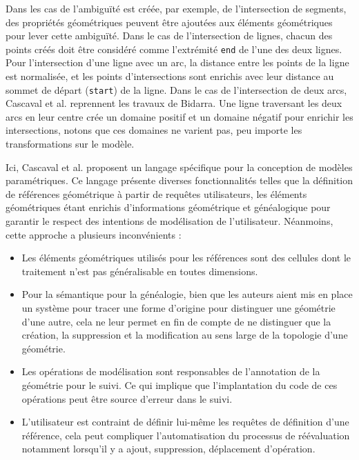 \documentclass[11pt, a4paper]{article}
\begin{document}

Dans les cas de l'ambiguïté est créée, par exemple, de l'intersection de
segments, des propriétés géométriques peuvent être ajoutées aux éléments
géométriques pour lever cette ambiguïté. %
Dans le cas de l'intersection de lignes, chacun des points créés doit être
considéré comme l'extrémité \texttt{end} de l'une des deux lignes. %
Pour l’intersection d'une ligne avec un arc, la distance entre les points de la
ligne est normalisée, et les points d'intersections sont enrichis avec leur
distance au sommet de départ (\texttt{start}) de la ligne. %
Dans le cas de l’intersection de deux arcs, Cascaval et al. reprennent les
travaux de Bidarra. Une ligne traversant les deux arcs en leur centre crée un
domaine positif et un domaine négatif pour enrichir les intersections, notons
que ces domaines ne varient pas, peu importe les transformations sur le modèle. %


Ici, Cascaval et al. proposent un langage spécifique pour la conception de
modèles paramétriques. Ce langage présente diverses fonctionnalités telles que
la définition de références géométrique à partir de requêtes utilisateurs, les
éléments géométriques étant enrichis d'informations géométrique et généalogique
pour garantir le respect des intentions de modélisation de l'utilisateur.
Néanmoins, cette approche a plusieurs inconvénients :
\begin{itemize}
	\item Les éléments géométriques utilisés pour les références sont des cellules
	      dont le traitement n'est pas généralisable en toutes dimensions.
	\item Pour la sémantique pour la généalogie, bien que les auteurs aient mis en
	      place un système pour tracer une forme d'origine pour distinguer une
	      géométrie d'une autre, cela ne leur permet en fin de compte de ne
	      distinguer que la création, la suppression et la modification au sens
	      large de la topologie d'une géométrie.
	\item Les opérations de modélisation sont responsables de l'annotation de la
	      géométrie pour le suivi. Ce qui implique que l'implantation du code de
	      ces opérations peut être source d'erreur dans le suivi.
	\item L'utilisateur est contraint de définir lui-même les requêtes de
	      définition d'une référence, cela peut compliquer l'automatisation du
	      processus de réévaluation notamment lorsqu'il y a ajout, suppression,
	      déplacement d'opération.
\end{itemize}
\end{document}
